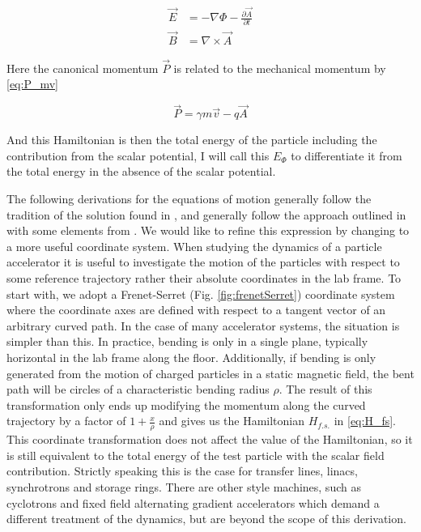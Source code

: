 \begin{equation} \label{eq:phi_A}
\begin{split} 
\vec{E} &= -\nabla \Phi - \frac{\partial \vec{A}}{\partial t}\\
\vec{B} &= \nabla \times \vec{A}
\end{split}
\end{equation}

Here the canonical momentum $\vec{P}$ is related to the mechanical momentum by \ref{eq:P_mv}

\begin{equation} \label{eq:P_mv}
	\vec{P} = \gamma m\vec{v} - q \vec{A}
\end{equation}

And this Hamiltonian is then the total energy of the particle including the contribution from the scalar potential, I will call this $E_{\Phi}$ to differentiate it from the total energy in the absence of the scalar potential.

The following derivations for the equations of motion generally follow the tradition of the solution found in \cite{CourantSnyder}, and generally follow the approach outlined in \cite{Wolski} with some elements from \cite{Lee}. We would like to refine this expression by changing to a more useful coordinate system. When studying the dynamics of a particle accelerator it is useful to investigate the motion of the particles with respect to some reference trajectory rather their absolute coordinates in the lab frame. To start with, we adopt a Frenet-Serret (Fig. \ref{fig:frenetSerret}) coordinate system where the coordinate axes are defined with respect to a tangent vector of an arbitrary curved path.  In the case of many accelerator systems, the situation is simpler than this. In practice, bending is only in a single plane, typically horizontal in the lab frame along the floor. Additionally, if bending is only generated from the motion of charged particles in a static magnetic field, the bent path will be circles of a characteristic bending radius $\rho$. The result of this transformation only ends up modifying the momentum along the curved trajectory by a factor of $1 + \frac{x}{\rho}$ and gives us the Hamiltonian $H_{f.s.}$ in \ref{eq:H_fs}. This coordinate transformation does not affect the value of the Hamiltonian, so it is still equivalent to the total energy of the test particle with the scalar field contribution. Strictly speaking this is the case for transfer lines, linacs, synchrotrons and storage rings. There are other style machines, such as cyclotrons and fixed field alternating gradient accelerators which demand a different treatment of the dynamics, but are beyond the scope of this derivation.

